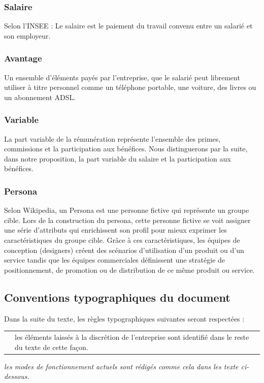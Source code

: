 \documentclass[12pt]{article}
\newcommand{\assemblee}[1]{%
  \begin{tcolorbox}[colframe=DarkPlum,boxrule=2pt,arc=4pt,left=6pt,right=6pt,top=6pt,bottom=6pt,boxsep=0pt,colback=white]
    \begin{tabular}{m{1cm} m{0.86\textwidth}}
      {\huge \faUsers} & #1 \\
    \end{tabular}
  \end{tcolorbox}
}
\newcommand{\actuel}[1]{%
  \begin{tcolorbox}[colframe=DarkButter,boxrule=2pt,arc=4pt,left=6pt,right=6pt,top=6pt,bottom=6pt,boxsep=0pt,colback=Aluminium2]
    \textit{#1}
  \end{tcolorbox}
}
\begin{document}
\subsubsection{Salaire}
 Selon l’INSEE : Le salaire est le paiement du travail convenu entre un salarié et son employeur. 

\subsubsection{Avantage}
 Un ensemble d’éléments payés par l’entreprise, que le salarié peut librement utiliser à titre personnel comme un téléphone portable, une voiture, des livres ou un abonnement ADSL.

\subsubsection{Variable}
 La part variable de la rémunération représente l’ensemble des primes, commissions et la participation aux bénéfices.
 Nous distinguerons par la suite, dans notre proposition, la part variable du salaire et la participation aux bénéfices.

\subsubsection{Persona}
 Selon Wikipedia, un Persona est une personne fictive qui représente un groupe cible. Lors de la construction du persona, cette personne fictive se voit assigner une série d'attributs qui enrichissent son profil pour mieux exprimer les caractéristiques du groupe cible. Grâce à ces caractéristiques, les équipes de conception (designers) créent des scénarios d'utilisation d'un produit ou d'un service tandis que les équipes commerciales définissent une stratégie de positionnement, de promotion ou de distribution de ce même produit ou service.

\subsection{Conventions typographiques du document}
  Dans la suite du texte, les règles typographiques suivantes seront respectées :

  \assemblee{les éléments laissés à la discrétion de l'entreprise sont identifié dans le reste du texte de cette façon.}

  \actuel{les modes de fonctionnement actuels sont rédigés comme cela dans les texte ci-dessous.}
\end{document}
